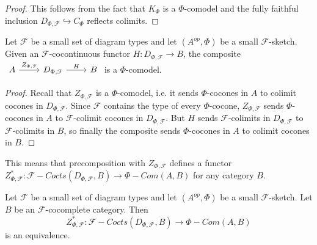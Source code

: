 \begin{proof}
  This follows from the fact that $K_{\Phi}$ is a $\Phi$-comodel and the fully
  faithful inclusion $D_{\Phi,\mathcal{F}}\hookrightarrow C_{\Phi}$ reflects
  colimits.
\end{proof}

\begin{lemma}
  Let $\mathcal{F}$ be a small set of diagram types and let $(A^{op},\Phi)$ be
  a small $\mathcal{F}$-sketch. Given an $\mathcal{F}$-cocontinuous functor
  $H:D_{\Phi,\mathcal{F}}\to B$, the composite $
  \begin{tikzcd} A &
    D_{\Phi,\mathcal{F}} & B \arrow["Z_{\Phi,\mathcal{F}}", from=1-1, to=1-2]
    \arrow["H", from=1-2, to=1-3]
  \end{tikzcd}$
  is a $\Phi$-comodel.
\end{lemma}

 \begin{proof}
   Recall that $Z_{\Phi,\mathcal{F}}$ is a $\Phi$-comodel, i.e. it sends
   $\Phi$-cocones in $A$ to colimit cocones in $D_{\Phi,\mathcal{F}}$. Since
   $\mathcal{F}$ contains the type of every $\Phi$-cocone,
   $Z_{\Phi,\mathcal{F}}$ sends $\Phi$-cocones in $A$ to $\mathcal{F}$-colimit
   cocones in $D_{\Phi,\mathcal{F}}$. But $H$ sends $\mathcal{F}$-colimits in
   $D_{\Phi,\mathcal{F}}$ to $\mathcal{F}$-colimits in $B$, so finally the
   composite sends $\Phi$-cocones in $A$ to colimit cocones in $B$.
 \end{proof}

This means that precomposition with $Z_{\Phi,\mathcal{F}}$ defines a functor
$Z_{\Phi,\mathcal{F}}^*:\mathcal{F}-Cocts(D_{\Phi,\mathcal{F}},B)\to\Phi-Com(A,B)$
for any category $B$.

\begin{theorem}\cite[theorem 6.23]{kelly/basic-concepts-enriched}\label{f_theory_small_sketch}

  \noindent Let $\mathcal{F}$ be a small set of diagram types and let
  $(A^{op},\Phi)$ be a small $\mathcal{F}$-sketch. Let $B$ be an
  $\mathcal{F}$-cocomplete category.
  Then $$Z_{\Phi,\mathcal{F}}^*:\mathcal{F}-Cocts(D_{\Phi,\mathcal{F}},B)\to\Phi-Com(A,B)$$
  is an equivalence.
\end{theorem}


